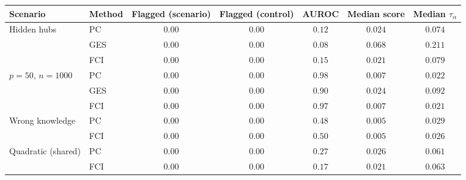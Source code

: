 \begin{tabular}{llccccc}
\toprule
Scenario & Method & Flagged (scenario) & Flagged (control) & AUROC & Median score & Median $\tau_\alpha$ \\
\midrule
Hidden hubs & PC & $0.00$ & $0.00$ & $0.12$ & $0.024$ & $0.074$ \\
 & GES & $0.00$ & $0.00$ & $0.08$ & $0.068$ & $0.211$ \\
 & FCI & $0.00$ & $0.00$ & $0.15$ & $0.021$ & $0.079$ \\
$p=50$, $n=1000$ & PC & $0.00$ & $0.00$ & $0.98$ & $0.007$ & $0.022$ \\
 & GES & $0.00$ & $0.00$ & $0.90$ & $0.024$ & $0.092$ \\
 & FCI & $0.00$ & $0.00$ & $0.97$ & $0.007$ & $0.021$ \\
Wrong knowledge & PC & $0.00$ & $0.00$ & $0.48$ & $0.005$ & $0.029$ \\
 & FCI & $0.00$ & $0.00$ & $0.50$ & $0.005$ & $0.026$ \\
Quadratic (shared) & PC & $0.00$ & $0.00$ & $0.27$ & $0.026$ & $0.061$ \\
 & FCI & $0.00$ & $0.00$ & $0.17$ & $0.021$ & $0.063$ \\
\bottomrule
\end{tabular}
